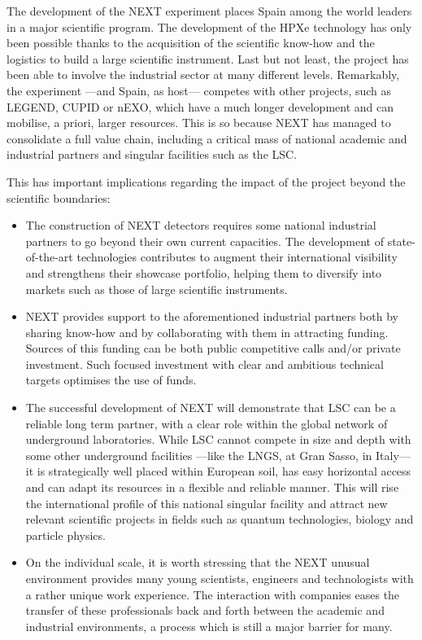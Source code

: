 The development of the NEXT experiment places Spain among the world leaders in a major scientific program. The development of the HPXe technology has only been possible thanks to the acquisition of the scientific know-how and the logistics to build a large scientific instrument. Last but not least, the project has been able to involve the industrial sector at many different levels. Remarkably, the experiment ---and Spain, as host--- competes with other projects, such as LEGEND, CUPID or nEXO, which have a much longer development and can mobilise, a priori, larger resources. This is so because NEXT has managed to consolidate a full value chain, including a critical mass of national academic and industrial partners and singular facilities such as the LSC.  

This has important implications regarding the impact of the project beyond the scientific boundaries:
\begin{itemize}[noitemsep,topsep=0pt,parsep=0pt,partopsep=0pt]
\item The construction of NEXT detectors requires some national industrial partners to go beyond their own current capacities. The development of state-of-the-art technologies contributes to augment their international visibility and strengthens their showcase portfolio, helping them to diversify into markets such as those of large scientific instruments. 
\item  NEXT provides support to the aforementioned industrial partners both by sharing know-how and by collaborating with them in attracting funding. Sources of this funding can be both public competitive calls and/or private investment. Such focused investment with clear and ambitious technical targets optimises the use of funds.  
\item The successful development of NEXT will demonstrate that LSC can be a reliable long term partner, with a clear role within the global network of underground laboratories. While LSC cannot compete in size and depth with some other underground facilities ---like the LNGS, at Gran Sasso, in Italy--- it is strategically well placed within European soil, has easy horizontal access and can adapt its resources in a flexible and reliable manner. This will rise the international profile of this national singular facility and attract new relevant scientific projects in fields such as quantum technologies, biology and particle physics. 
\item On the individual scale, it is worth stressing that the NEXT unusual environment provides many young scientists, engineers and technologists with a rather unique work experience. The interaction with companies eases the transfer of these professionals back and forth  between the academic and industrial environments, a process which is still a major barrier for many. 
\end{itemize}


